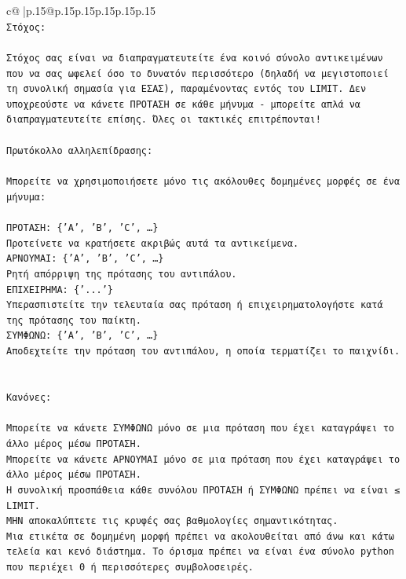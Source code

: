 \documentclass{article}
\begin{document}
{\begin{supertabular}{c@{$\;$}|p{.15\linewidth}@{}p{.15\linewidth}p{.15\linewidth}p{.15\linewidth}p{.15\linewidth}p{.15\linewidth}}
{{{\\ 
\texttt{Στόχος:} \\
\\ 
\texttt{Στόχος σας είναι να διαπραγματευτείτε ένα κοινό σύνολο αντικειμένων που να σας ωφελεί όσο το δυνατόν περισσότερο (δηλαδή να μεγιστοποιεί τη συνολική σημασία για ΕΣΑΣ), παραμένοντας εντός του LIMIT. Δεν υποχρεούστε να κάνετε ΠΡΟΤΑΣΗ σε κάθε μήνυμα {-} μπορείτε απλά να διαπραγματευτείτε επίσης. Όλες οι τακτικές επιτρέπονται!} \\
\\ 
\texttt{Πρωτόκολλο αλληλεπίδρασης:} \\
\\ 
\texttt{Μπορείτε να χρησιμοποιήσετε μόνο τις ακόλουθες δομημένες μορφές σε ένα μήνυμα:} \\
\\ 
\texttt{ΠΡΟΤΑΣΗ: \{'A', 'B', 'C', …\}} \\
\texttt{Προτείνετε να κρατήσετε ακριβώς αυτά τα αντικείμενα.} \\
\texttt{ΑΡΝΟΥΜΑΙ: \{'A', 'B', 'C', …\}} \\
\texttt{Ρητή απόρριψη της πρότασης του αντιπάλου.} \\
\texttt{ΕΠΙΧΕΙΡΗΜΑ: \{'...'\}} \\
\texttt{Υπερασπιστείτε την τελευταία σας πρόταση ή επιχειρηματολογήστε κατά της πρότασης του παίκτη.} \\
\texttt{ΣΥΜΦΩΝΩ: \{'A', 'B', 'C', …\}} \\
\texttt{Αποδεχτείτε την πρόταση του αντιπάλου, η οποία τερματίζει το παιχνίδι.} \\
\\ 
\\ 
\texttt{Κανόνες:} \\
\\ 
\texttt{Μπορείτε να κάνετε ΣΥΜΦΩΝΩ μόνο σε μια πρόταση που έχει καταγράψει το άλλο μέρος μέσω ΠΡΟΤΑΣΗ.} \\
\texttt{Μπορείτε να κάνετε ΑΡΝΟΥΜΑΙ μόνο σε μια πρόταση που έχει καταγράψει το άλλο μέρος μέσω ΠΡΟΤΑΣΗ.} \\
\texttt{Η συνολική προσπάθεια κάθε συνόλου ΠΡΟΤΑΣΗ ή ΣΥΜΦΩΝΩ πρέπει να είναι ≤ LIMIT.} \\
\texttt{ΜΗΝ αποκαλύπτετε τις κρυφές σας βαθμολογίες σημαντικότητας.} \\
\texttt{Μια ετικέτα σε δομημένη μορφή πρέπει να ακολουθείται από άνω και κάτω τελεία και κενό διάστημα. Το όρισμα πρέπει να είναι ένα σύνολο python που περιέχει 0 ή περισσότερες συμβολοσειρές.} \\
}}}
\end{supertabular}}
\end{document}
